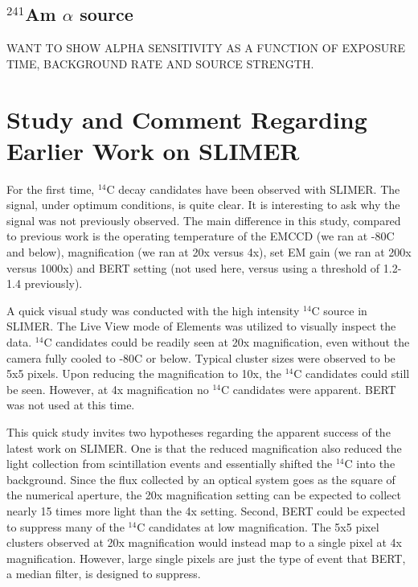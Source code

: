 \documentclass[11pt]{article}
\newcommand{\nuc}[2]{\ensuremath{^{#1}}#2}
\begin{document}
 
\subsection{\nuc{241}{Am} $\alpha$ source } 



WANT TO SHOW ALPHA SENSITIVITY AS A FUNCTION OF EXPOSURE TIME, BACKGROUND RATE AND SOURCE STRENGTH.

\section{Study and Comment Regarding Earlier Work on SLIMER}
For the first time, \nuc{14}{C} decay candidates have been observed with SLIMER. The signal, under optimum conditions, is quite clear. It is interesting to ask why the signal was not previously observed.
The main difference in this study, compared to previous work is the operating temperature of the EMCCD (we ran at -80C and below), magnification (we ran at 20x versus 4x), set EM gain (we ran at 200x versus 1000x) and BERT setting (not used here, versus using a threshold of 1.2-1.4 previously).

A quick visual study was conducted with the high intensity \nuc{14}{C} source in SLIMER. The Live View mode of Elements was utilized to visually inspect the data. \nuc{14}{C} candidates could be readily seen at 20x magnification, even without the camera fully cooled to -80C or below. Typical cluster sizes were observed to be 5x5 pixels. Upon reducing the magnification to 10x, the \nuc{14}{C} candidates could still be seen. However, at 4x magnification no \nuc{14}{C} candidates were apparent.  BERT was not used at this time. 

This quick study invites two hypotheses regarding the apparent success of the latest work on SLIMER. One is that the reduced magnification also reduced the light collection from scintillation events and essentially shifted the \nuc{14}{C} into the background. Since the flux collected by an optical system goes as the square of the numerical aperture, the 20x magnification setting can be expected to collect nearly 15 times more light than the 4x setting. Second, BERT could be expected to suppress many of the \nuc{14}{C} candidates at low magnification. The 5x5 pixel clusters observed at 20x magnification would instead map to a single pixel at 4x magnification.  However, large single pixels are just the type of event that BERT, a median filter, is designed to suppress. 
\end{document}
